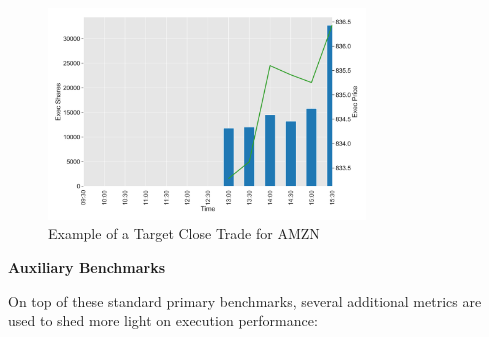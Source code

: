 	\begin{figure}[!ht]
	\centering
	\includegraphics[width=0.75\textwidth]{chapters/chapter_exec_models/figures/close.png} 
	\caption{Example of a Target Close Trade for AMZN \label{fig:close}}
	\end{figure}


\noindent\textbf{Auxiliary Benchmarks} 

On top of these standard primary benchmarks, several additional metrics are used to shed more light on execution performance:

